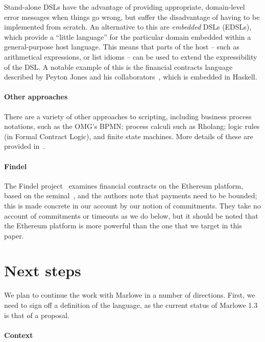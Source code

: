 \documentclass[runningheads]{llncs}
\begin{document}
Stand-alone DSLs have the advantage of providing appropriate, domain-level error messages when things go wrong, but 
suffer the disadvantage of having to be implemented from scratch. An alternative to this are \emph{embedded} DSLs 
(EDSLs), which provide a ``little language'' for the particular domain embedded within a general-purpose host language. 
This means that parts of the host -- such as arithmetical expressions, or list idioms --  can be used to extend the 
expressibility of the DSL. A notable example of this is the financial contracts language described by Peyton Jones and 
his collaborators~\cite{PeytonJones:2000}, which is embedded in Haskell.

\paragraph{Other approaches}

There are a variety of other approaches to scripting, including business process notations, such as the OMG's BPMN; 
process calculi such as Rholang; logic rules (in Formal Contract Logic), and finite state machines. More details of 
these are provided in~\cite{cryptoeprint:2016:1156}.

\paragraph{Findel}

The Findel project~\cite{findel} examines financial contracts on the Ethereum platform, based on the 
seminal~\cite{PeytonJones:2000}, and the authors note that payments need to be bounded; this is made concrete in our 
account by our notion of commitments. They take no account of commitments or timeouts as we do below, but it should be 
noted that the Ethereum platform is more powerful than the one that we target in this paper.


\section{Next steps}
\label{section:next-steps}

We plan to continue the work with Marlowe in a number of directions. First, we need to sign off a definition of the 
language, as the current status of Marlowe 1.3 is that of a proposal.

\paragraph{Context}
\end{document}
